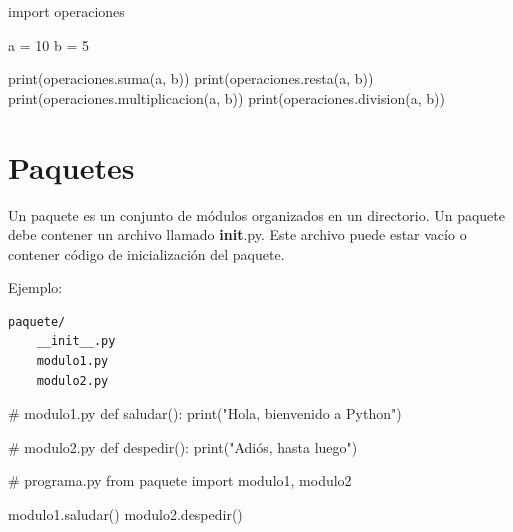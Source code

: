 \documentclass[
  a4paper,
  DIV=11,
  numbers=noendperiod,
  onepage,
  openany]{scrreprt}
\newenvironment{Shaded}{\begin{snugshade}}{\end{snugshade}}
\newcommand{\BuiltInTok}[1]{\textcolor[rgb]{0.00,0.23,0.31}{#1}}
\newcommand{\CommentTok}[1]{\textcolor[rgb]{0.37,0.37,0.37}{#1}}
\newcommand{\DecValTok}[1]{\textcolor[rgb]{0.68,0.00,0.00}{#1}}
\newcommand{\ImportTok}[1]{\textcolor[rgb]{0.00,0.46,0.62}{#1}}
\newcommand{\KeywordTok}[1]{\textcolor[rgb]{0.00,0.23,0.31}{#1}}
\newcommand{\NormalTok}[1]{\textcolor[rgb]{0.00,0.23,0.31}{#1}}
\newcommand{\OperatorTok}[1]{\textcolor[rgb]{0.37,0.37,0.37}{#1}}
\newcommand{\StringTok}[1]{\textcolor[rgb]{0.13,0.47,0.30}{#1}}
\begin{document}
\begin{Shaded}
\begin{Highlighting}[]

\ImportTok{import}\NormalTok{ operaciones}

\NormalTok{a }\OperatorTok{=} \DecValTok{10}
\NormalTok{b }\OperatorTok{=} \DecValTok{5}

\BuiltInTok{print}\NormalTok{(operaciones.suma(a, b))}
\BuiltInTok{print}\NormalTok{(operaciones.resta(a, b))}
\BuiltInTok{print}\NormalTok{(operaciones.multiplicacion(a, b))}
\BuiltInTok{print}\NormalTok{(operaciones.division(a, b))}
\end{Highlighting}
\end{Shaded}

\chapter{Paquetes}\label{paquetes}

Un paquete es un conjunto de módulos organizados en un directorio. Un
paquete debe contener un archivo llamado \textbf{init}.py. Este archivo
puede estar vacío o contener código de inicialización del paquete.

Ejemplo:

\begin{verbatim}
paquete/
    __init__.py
    modulo1.py
    modulo2.py
\end{verbatim}

\begin{Shaded}
\begin{Highlighting}[]
\CommentTok{\# modulo1.py}
\KeywordTok{def}\NormalTok{ saludar():}
    \BuiltInTok{print}\NormalTok{(}\StringTok{"Hola, bienvenido a Python"}\NormalTok{)}
\end{Highlighting}
\end{Shaded}

\begin{Shaded}
\begin{Highlighting}[]
\CommentTok{\# modulo2.py}
\KeywordTok{def}\NormalTok{ despedir():}
    \BuiltInTok{print}\NormalTok{(}\StringTok{"Adiós, hasta luego"}\NormalTok{)}
\end{Highlighting}
\end{Shaded}

\begin{Shaded}
\begin{Highlighting}[]
\CommentTok{\# programa.py}
\ImportTok{from}\NormalTok{ paquete }\ImportTok{import}\NormalTok{ modulo1, modulo2}

\NormalTok{modulo1.saludar()}
\NormalTok{modulo2.despedir()}
\end{Highlighting}
\end{Shaded}
\end{document}
